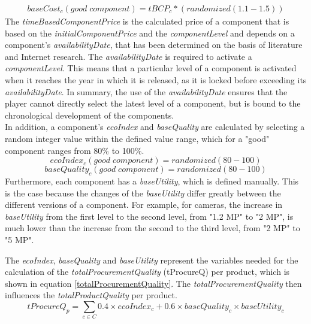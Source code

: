 \begin{equation}
\label{baseCost}
\begin{aligned}
   baseCost_{c}(good \; component) = tBCP_{c} * (randomized(1.1-1.5))
\end{aligned}    
\end{equation}
The \textit{timeBasedComponentPrice} is the calculated price of a component that is based on the \textit{initialComponentPrice} and the \textit{componentLevel} and depends on a component's \textit{availabilityDate}, that has been determined on the basis of literature and Internet research. The \textit{availabilityDate} is required to activate a \textit{componentLevel}. This means that a particular level of a component is activated when it reaches the year in which it is released, as it is locked before exceeding its \textit{availabilityDate}. In summary, the use of the \textit{availabilityDate} ensures that the player cannot directly select the latest level of a component, but is bound to the chronological development of the components.\\
In addition, a component's \textit{ecoIndex} and \textit{baseQuality} are calculated by selecting a random integer value within the defined value range, which for a "good" component ranges from 80\% to 100\%.
\begin{equation}
    ecoIndex_{c}(good \; component) = randomized(80-100)
\end{equation}
\begin{equation}
    baseQuality_{c}(good \; component) = randomized(80-100)
\end{equation}
Furthermore, each component has a \textit{baseUtility}, which is defined manually. This is the case because the changes of the \textit{baseUtility} differ greatly between the different versions of a component. For example, for cameras, the increase in \textit{baseUtility} from the first level to the second level, from "1.2 MP" to "2 MP", is much lower than the increase from the second to the third level, from "2 MP" to "5 MP". 

The \textit{ecoIndex}, \textit{baseQuality} and \textit{baseUtility} represent the variables needed for the calculation of the \textit{totalProcurementQuality} (\gls{tProcureQ}) per product, which is shown in equation \ref{totalProcurementQuality}. The \textit{totalProcurementQuality} then influences the \textit{totalProductQuality} per product.
\begin{equation}
\label{totalProcurementQuality}
    tProcureQ_{p}= \sum_{c \in C} 0.4 \times ecoIndex_{c} + 0.6 \times baseQuality_{c} \times baseUtility_{c}
\end{equation}

